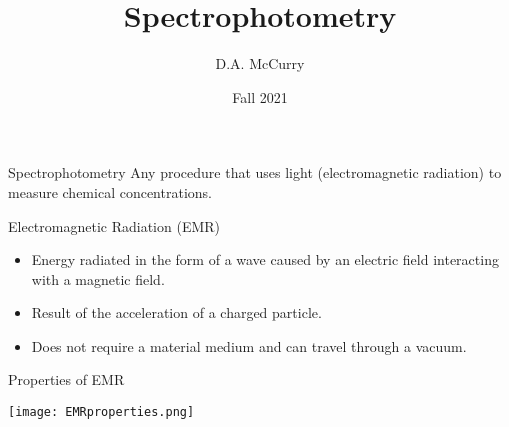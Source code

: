 \documentclass[notes=only]{beamer}
\title{Spectrophotometry}
\institute{CHEM321 --- Analytical Chemistry I \\ Bloomsburg University}
\author{D.A. McCurry}
\date{Fall 2021}
\begin{document}
\maketitle
{}


\begin{frame}{Spectrophotometry}
	Any procedure that uses light (electromagnetic radiation) to measure
	chemical concentrations.

	\bigskip

	\begin{block}{Electromagnetic Radiation (EMR)}
		\begin{itemize}
			\item Energy radiated in the form of a \alert{wave}
				caused by an electric field interacting with a
				magnetic field.
			\item Result of the acceleration of a charged particle.
			\item Does not require a material medium and can travel
				through a vacuum.
		\end{itemize}
	\end{block}
\end{frame}


\begin{frame}{Properties of EMR}

	\begin{center}
		\texttt{[image: EMRproperties.png]}
	\end{center}
\end{frame}
\end{document}
